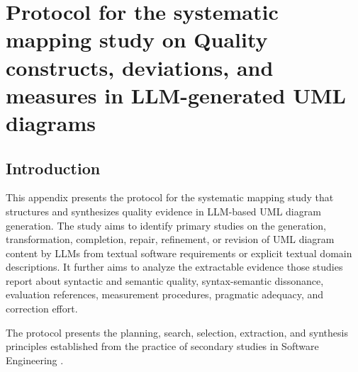 %

\providecommand{\protocolfield}[1]{\textbf{[#1]}}
\providecommand{\yes}{\textit{Yes}}
\providecommand{\partial}{\textit{Partially}}
\providecommand{\no}{\textit{No}}
\newcommand{\reviewtitle}{Quality constructs, deviations, and measures in LLM-generated UML diagrams}

\chapter{Protocol for the systematic mapping study on \reviewtitle}
\label{app:quality_focused_mapping_protocol}

\section{Introduction}
\label{sec:protocol_identification}

This appendix presents the protocol for the systematic mapping study that structures and synthesizes quality evidence in LLM-based UML diagram generation. The study aims to identify primary studies on the generation, transformation, completion, repair, refinement, or revision of UML diagram content by LLMs from textual software requirements or explicit textual domain descriptions. It further aims to analyze the extractable evidence those studies report about syntactic and semantic quality, syntax-semantic dissonance, evaluation references, measurement procedures, pragmatic adequacy, and correction effort.

The protocol presents the planning, search, selection, extraction, and synthesis principles established from the practice of secondary studies in Software Engineering \cite{Kitchenham2007Guidelines,Brereton2007Lessons,Petersen2015Mapping,Zhang2011Identifying}.


